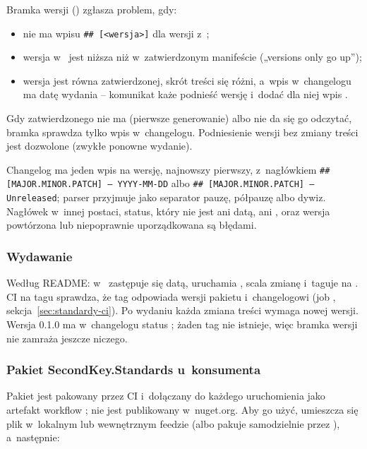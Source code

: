 Bramka wersji () zgłasza problem, gdy:
\begin{itemize}
  \item {} nie ma wpisu \texttt{\#\# [<wersja>]} dla wersji z~;
  \item wersja w~ jest niższa niż w~zatwierdzonym manifeście
        („versions only go up”);
  \item wersja jest równa zatwierdzonej, skrót treści się różni, a~wpis w~changelogu ma datę
        wydania -- komunikat każe podnieść wersję i~dodać dla niej wpis .
\end{itemize}
Gdy zatwierdzonego  nie ma (pierwsze generowanie) albo nie da
się go odczytać, bramka sprawdza tylko wpis w~changelogu. Podniesienie wersji bez zmiany
treści jest dozwolone (zwykłe ponowne wydanie).

Changelog ma jeden wpis na wersję, najnowszy pierwszy, z~nagłówkiem
\texttt{\#\# [MAJOR.MINOR.PATCH] — YYYY-MM-DD} albo \texttt{\#\# [MAJOR.MINOR.PATCH] —
Unreleased}; parser przyjmuje jako separator pauzę, półpauzę albo dywiz. Nagłówek w~innej
postaci, status, który nie jest ani datą, ani , oraz wersja
powtórzona lub niepoprawnie uporządkowana są błędami.

\subsubsection{Wydawanie}

Według README: w~ zastępuje się  datą, uruchamia
, scala zmianę i~taguje  na . CI na
tagu sprawdza, że tag odpowiada wersji pakietu i~changelogowi (job ,
sekcja~\ref{sec:standardy-ci}). Po wydaniu każda zmiana treści wymaga nowej wersji. Wersja
0.1.0 ma w~changelogu status ; żaden tag nie istnieje, więc bramka
wersji nie zamraża jeszcze niczego.

\subsubsection{Pakiet SecondKey.Standards u~konsumenta}

Pakiet jest pakowany przez CI i~dołączany do każdego uruchomienia jako artefakt workflow
; nie jest publikowany w~nuget.org. Aby go użyć,
umieszcza się plik  w~lokalnym lub wewnętrznym feedzie (albo pakuje
samodzielnie przez ), a~następnie:

